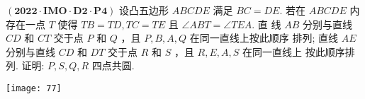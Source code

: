$(\mathbf{2 0 2 2} \cdot \mathbf{I M O} \cdot \mathbf{D 2} \cdot \mathbf{P 4})$ 
设凸五边形 $A B C D E$ 满足 $B C=D E$. 若在 $A B C D E$ 内存在一点 $T$ 使得 $T B=T D,T C=T E$ 且 $\angle A B T=\angle T E A$. 
直 线 $A B$ 分别与直线 $C D$ 和 $C T$ 交于点 $P$ 和 $Q$ ，且 $P, B, A, Q$ 在同一直线上按此顺序 排列; 
直线 $A E$ 分别与直线 $C D$ 和 $D T$ 交于点 $R$ 和 $S$ ，且 $R, E, A, S$ 在同一直线上 按此顺序排列. 证明: $P, S, Q, R$ 四点共圆.
\begin{flushleft}
    \texttt{[image: 77]}
\end{flushleft}